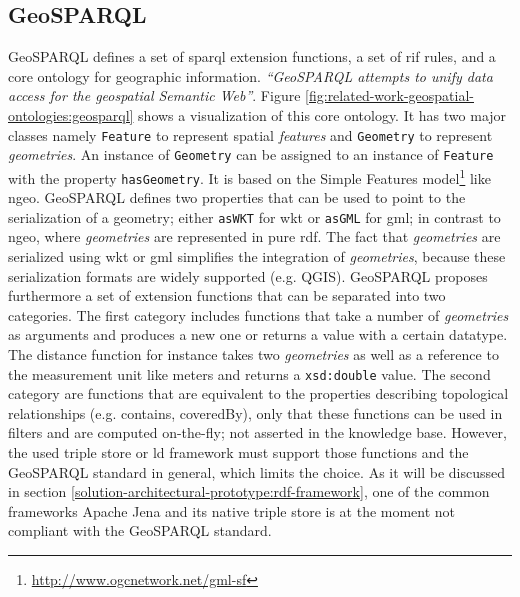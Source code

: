 \documentclass[draft,final]{vutinfth} %
\begin{document}
\subsection{GeoSPARQL}
GeoSPARQL defines a set of \gls{sparql} extension functions, a set of \gls{rif} rules, and a core ontology for geographic information\cite{perry_ogc_2012}. \textit{``GeoSPARQL attempts to unify data access for the geospatial Semantic Web''}\cite{battle_geosparql:_2011}. Figure \ref{fig:related-work-geospatial-ontologies:geosparql} shows a visualization of this core ontology. It has two major classes namely \texttt{Feature} to represent spatial \textit{features} and \texttt{Geometry} to represent \textit{geometries}. An instance of \texttt{Geometry} can be assigned to an instance of \texttt{Feature} with the property \texttt{hasGeometry}. It is based on the Simple Features model\footnote{\url{http://www.ogcnetwork.net/gml-sf}} like \gls{ngeo}. GeoSPARQL defines two properties that can be used to point to the serialization of a geometry; either \texttt{asWKT} for \gls{wkt} or \texttt{asGML} for \gls{gml}; in contrast to \gls{ngeo}, where \textit{geometries} are represented in pure \gls{rdf}. The fact that \textit{geometries} are serialized using \gls{wkt} or \gls{gml} simplifies the integration of \textit{geometries}, because these serialization formats are widely supported (e.g. QGIS). GeoSPARQL proposes furthermore a set of extension functions that can be separated into two categories. The first category includes functions that take a number of \textit{geometries} as arguments and produces a new one or returns a value with a certain datatype. The distance function for instance takes two \textit{geometries} as well as a reference to the measurement unit like meters and returns a \texttt{xsd:double} value. The second category are functions that are equivalent to the properties describing topological relationships (e.g. contains, coveredBy), only that these functions can be used in filters and are computed on-the-fly; not asserted in the knowledge base. However, the used triple store or \gls{ld} framework must support those functions and the GeoSPARQL standard in general, which limits the choice. As it will be discussed in section \ref{solution-architectural-prototype:rdf-framework}, one of the common frameworks Apache Jena and its native triple store is at the moment not compliant with the GeoSPARQL standard. 
\end{document}
